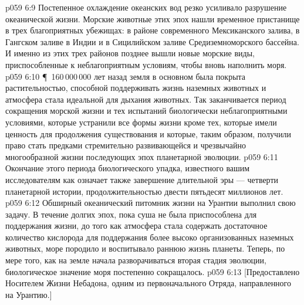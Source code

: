 \vs p059 6:9 Постепенное охлаждение океанских вод резко усиливало разрушение океанической жизни. Морские животные этих эпох нашли временное пристанище в трех благоприятных убежищах: в районе современного Мексиканского залива, в Гангском заливе в Индии и в Сицилийском заливе Средиземноморского бассейна. И именно из этих трех районов позднее вышли новые морские виды, приспособленные к неблагоприятным условиям, чтобы вновь наполнить моря.
\vs p059 6:10 \P\ 160\,000\,000 лет назад земля в основном была покрыта растительностью, способной поддерживать жизнь наземных животных и атмосфера стала идеальной для дыхания животных. Так заканчивается период сокращения морской жизни и тех испытаний биологически неблагоприятными условиями, которые устранили все формы жизни кроме тех, которые имели ценность для продолжения существования и которые, таким образом, получили право стать предками стремительно развивающейся и чрезвычайно многообразной жизни последующих эпох планетарной эволюции.
\vs p059 6:11 Окончание этого периода биологического упадка, известного вашим исследователям как  означает также завершение длительной  эры --- четверти планетарной истории, продолжительностью двести пятьдесят миллионов лет.
\vs p059 6:12 Обширный океанический питомник жизни на Урантии выполнил свою задачу. В течение долгих эпох, пока суша не была приспособлена для поддержания жизни, до того как атмосфера стала содержать достаточное количество кислорода для поддержания более высоко организованных наземных животных, море породило и воспитывало раннюю жизнь планеты. Теперь, по мере того, как на земле начала разворачиваться вторая стадия эволюции, биологическое значение моря постепенно сокращалось.
\vs p059 6:13 [Предоставлено Носителем Жизни Небадона, одним из первоначального Отряда, направленного на Урантию.]

